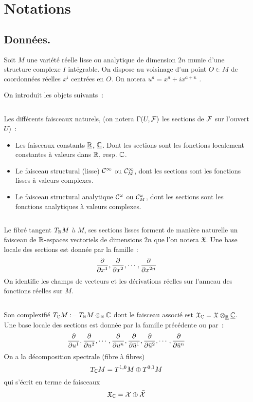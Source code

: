 \documentclass[a4paper,11pt,draft,makeidx,twocolumn]{amsart}
\begin{document}
\section{Notations}
\subsection*{Données.}
Soit $M$ une variété réelle lisse ou analytique de dimension $2n$ munie d'une structure complexe $I$ intégrable. On dispose au voisinage d'un point $O \in M$ de coordonnées réelles $x^i$ centrées en $O$. On notera $u^a = x^a + ix^{a+n}$	.

On introduit les objets suivants~:
\subsection{} Les différents faisceaux naturels, (on notera $\Gamma(U,\mathcal{F})$ les sections de $\mathcal{F}$ sur l'ouvert $U$)~:
\begin{itemize}
\item Les faisceaux constants $\underline{\mathbb{R}}$, $\underline{\mathbb{C}}$. Dont les sections sont les fonctions localement constantes à valeurs dans $\mathbb{R}$, resp. $\mathbb{C}$.
\item Le faisceau structural (lisse) $\mathcal{C}^\infty$ ou $\mathcal{C}^\infty_M$, dont les sections sont les fonctions lisses à valeurs complexes.
\item Le faisceau structural analytique $\mathcal{C}^\omega$ ou $\mathcal{C}^\omega_M$, dont les sections sont les fonctions analytiques à valeurs complexes.
\end{itemize}
\subsection{} Le fibré tangent $T_{\mathbb{R}} M$ à $M$, ses sections lisses forment de manière naturelle un faisceau de $\mathbb{R}$-espaces vectoriels de dimensions $2n$ que l'on notera $\mathfrak{X}$. Une base locale des sections est donnée par la famille~:
\[
\dfrac{\partial{}}{\partial{x^1}} , \dfrac{\partial{}}{\partial{x^2}} , \cdots , \dfrac{\partial{}}{\partial{x^{2n}}}
\]
On identifie les champs de vecteurs et les dérivations réelles sur l'anneau des fonctions réelles sur $M$.
\subsection{} Son complexifié $T_{\mathbb{C}} M := T_{\mathbb{R}} M \otimes_{\mathbb{R}} \mathbb{C}$ dont le faisceau associé est $\mathfrak{X}_{\mathbb{C}} = \mathfrak{X} \otimes_{\underline{\mathbb{R}}} \underline{\mathbb{C}}$.
Une base locale des sections est donnée par la famille précédente ou par~:
\[
\dfrac{\partial{}}{\partial{u^1}} , \dfrac{\partial{}}{\partial{u^2}} , \cdots , \dfrac{\partial{}}{\partial{u^{n}}} , \dfrac{\partial{}}{\partial{\bar{u}^1}} , \dfrac{\partial{}}{\partial{\bar{u}^2}} , \cdots , \dfrac{\partial{}}{\partial{\bar{u}^{n}}}
\]
On a la décomposition spectrale (fibre à fibres)
\[
T_{\mathbb{C}} M = T^{1,0}M \oplus T^{0,1}M
\]
qui s'écrit en terme de faisceaux
\begin{equation}
\mathfrak{X}_{\mathbb{C}} = \mathcal{X} \oplus \bar{\mathcal{X}}
\end{equation}
\end{document}
